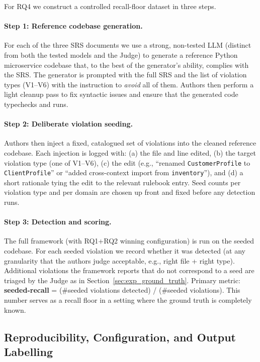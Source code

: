 \documentclass[smallextended]{svjour3}
\begin{document}
For RQ4 we construct a controlled recall-floor dataset in three steps.

\paragraph{Step 1: Reference codebase generation.}
For each of the three SRS documents we use a strong, non-tested LLM (distinct from both the tested models and the Judge) to generate a reference Python microservice codebase that, to the best of the generator's ability, complies with the SRS.
The generator is prompted with the full SRS and the list of violation types (V1--V6) with the instruction to \emph{avoid} all of them.
Authors then perform a light cleanup pass to fix syntactic issues and ensure that the generated code typechecks and runs.

\paragraph{Step 2: Deliberate violation seeding.}
Authors then inject a fixed, catalogued set of violations into the cleaned reference codebase.
Each injection is logged with: (a) the file and line edited, (b) the target violation type (one of V1--V6), (c) the edit (e.g., ``renamed \texttt{CustomerProfile} to \texttt{ClientProfile}'' or ``added cross-context import from \texttt{inventory}''), and (d) a short rationale tying the edit to the relevant rulebook entry.
Seed counts per violation type and per domain are chosen up front and fixed before any detection runs.

\paragraph{Step 3: Detection and scoring.}
The full framework (with RQ1+RQ2 winning configuration) is run on the seeded codebase.
For each seeded violation we record whether it was detected (at any granularity that the authors judge acceptable, e.g., right file + right type).
Additional violations the framework reports that do not correspond to a seed are triaged by the Judge as in Section~\ref{sec:exp_ground_truth}.
Primary metric: \textbf{seeded-recall} = (\#seeded violations detected) / (\#seeded violations).
This number serves as a recall floor in a setting where the ground truth is completely known.

\subsection{Reproducibility, Configuration, and Output Labelling}
\label{sec:exp_reproducibility}
\end{document}

